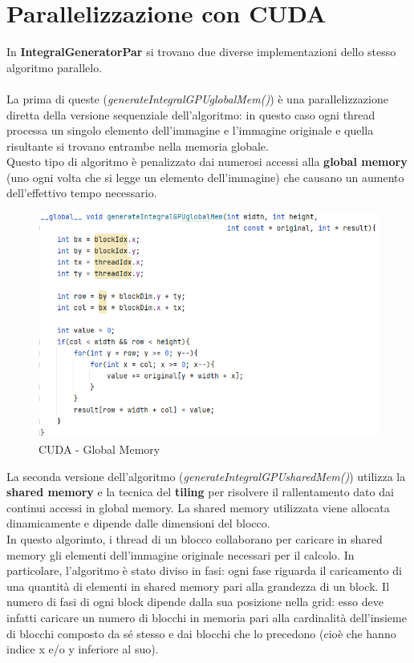 \documentclass[10pt,twocolumn,letterpaper]{article}
\begin{document}
\section{Parallelizzazione con CUDA}
In \textbf{IntegralGeneratorPar} si trovano due diverse implementazioni dello stesso algoritmo parallelo.\\
\\
La prima di queste (\textit{generateIntegralGPUglobalMem()}) è una parallelizzazione diretta della versione sequenziale dell’algoritmo: in questo caso ogni thread processa un singolo elemento dell’immagine e l’immagine originale e quella risultante si trovano entrambe nella memoria globale.\\
Questo tipo di algoritmo è penalizzato dai numerosi accessi alla \textbf{global memory} (uno ogni volta che si legge un elemento dell’immagine) che causano un aumento dell’effettivo tempo necessario.
\begin{figure}[H]
\includegraphics[width=1\linewidth]{code/cuda1.png} 
\caption{\small CUDA - Global Memory}
\label{cudacode1}
\end{figure}
La seconda versione dell’algoritmo (\textit{generateIntegralGPUsharedMem()}) utilizza la \textbf{shared memory} e la tecnica del \textbf{tiling} per risolvere il rallentamento dato dai continui accessi in global memory. La shared memory utilizzata viene allocata dinamicamente e dipende dalle dimensioni del blocco.\\
In questo algorimto, i thread di un blocco collaborano per caricare in shared memory gli elementi dell’immagine originale necessari per il calcolo. In particolare, l’algoritmo è stato diviso in fasi: ogni fase riguarda il caricamento di una quantità di elementi in shared memory pari alla grandezza di un block. Il numero di fasi di ogni block dipende dalla sua posizione nella grid: esso deve infatti caricare un numero di blocchi in memoria pari alla cardinalità dell'insieme di blocchi composto da sé stesso e dai blocchi che lo precedono (cioè che hanno indice x e/o y inferiore al suo).
\end{document}
